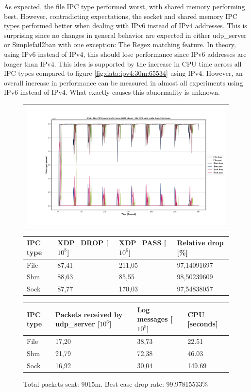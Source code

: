 As expected, the file IPC type performed worst, with shared memory performing best.
However, contradicting expectations, the socket and shared memory IPC types performed better when dealing with IPv6 instead of IPv4 addresses.
This is surprising since no changes in general behavior are expected in either udp\_server or Simplefail2ban with one exception: The Regex matching feature.
In theory, using IPv6 instead of IPv4, this should lose performance since IPv6 addresses are longer than IPv4.
This idea is supported by the increase in CPU time across all IPC types compared to figure \ref{fig:data:ipv4:30m:65534} using IPv4.
However, an overall increase in performance can be measured in almost all experiments using IPv6 instead of IPv4.
What exactly causes this abnormality is unknown.

\begin{figure}[!h]
	\centering
	\scriptsize
	\begin{tabular}{c}
    	\centerline{\includegraphics[width=1.2\textwidth]{images/IPv6_30m_65534_1.png}}
	\end{tabular}
	\begin{tabular}{llll}
		\toprule
		\textbf{IPC type} & \textbf{XDP\_DROP [$10^8$]} & \textbf{XDP\_PASS [$10^6$]} & \textbf{Relative drop [\%]} \\ \midrule 
		File & 87,41 & 211,05 & 97,14091697 \\
        Shm & 88,63 & 85,55 & 98,50239609 \\
        Sock & 87,77 & 170,03 & 97,54838057 \\
	\bottomrule
	\end{tabular}
    \begin{tabular}{llll}
		\toprule
		\textbf{IPC type} & \textbf{Packets received by udp\_server [$10^6$]} & \textbf{Log messages [$10^5$]} & \textbf{CPU [seconds]} \\ \midrule 
		File & 17,20 & 38,73 & 22.51 \\
        Shm & 21,79 & 72,38 & 46.03 \\
        Sock & 16,92 & 30,04 & 149.69 \\
	\bottomrule
	\end{tabular}
	\caption[Simplefail2ban, IPv6, 30m \ac{PPS}, 65534 malicious clients]{Total packets sent: 9015m. Best case drop rate: 99,97815533\%}
	\label{fig:data:ipv6:30m:65534}
\end{figure}

